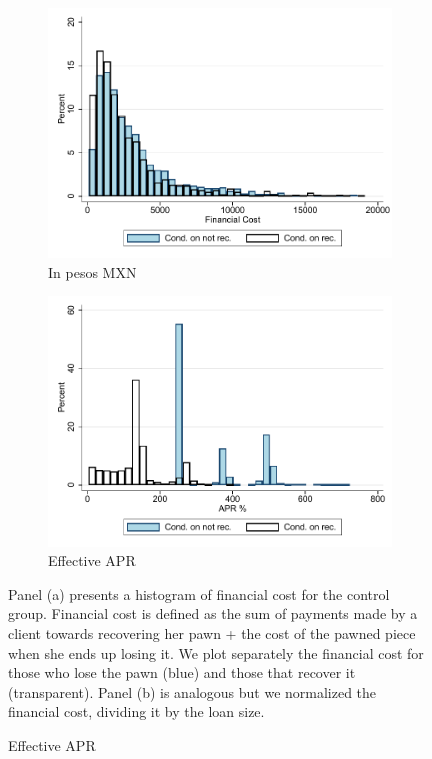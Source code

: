 \documentclass[oneside,11pt]{article}
\begin{document}
\vspace{.2in}
\begin{figure}[H]
     \caption{Financial cost}
    \label{fc_hist}
    \begin{center}
    \begin{subfigure}{.45\textwidth}
      \caption{In pesos MXN}
        \centering
        \includegraphics[width=\textwidth]{Figuras/hist_fc.pdf}
    \end{subfigure}
     \begin{subfigure}{0.45\textwidth}
    \caption{Effective APR}
       \centering
      \includegraphics[width=\textwidth]{Figuras/hist_apr.pdf}
    \end{subfigure}
    \end{center}
         \scriptsize
         Panel (a) presents a histogram of financial cost for the control group. Financial cost is defined as the sum of payments made by a client towards recovering her pawn + the cost of the pawned piece when she ends up losing it. We plot separately the financial cost for those who lose the pawn (blue) and those that recover it (transparent).  Panel (b) is analogous but we normalized the financial cost, dividing it by the loan size.  %
\end{figure}
\end{document}
